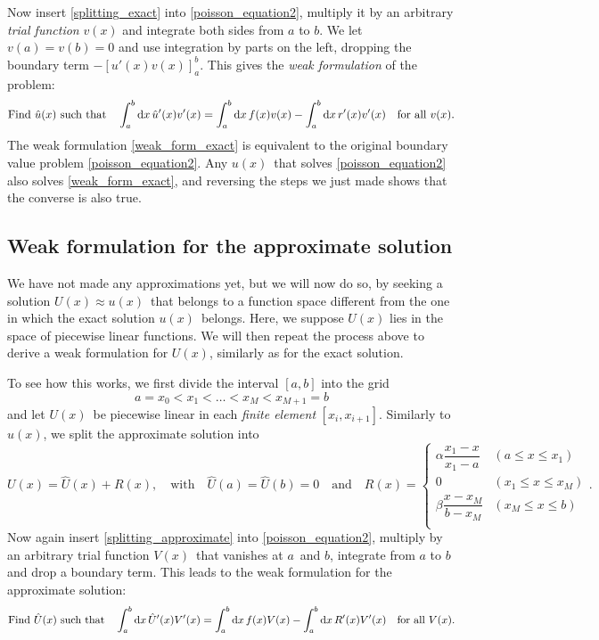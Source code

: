 Now insert \ref{splitting_exact} into \cref{poisson_equation2}, multiply it by an arbitrary \emph{trial function} $v(x)$ and integrate both sides from $a$ to $b$.
We let $v(a) = v(b) = 0$ and use integration by parts on the left, dropping the boundary term $-[u'(x) v(x)]_a^b$.
This gives the \emph{weak formulation} of the problem:
\newcommand{\weakform}[3]{
\text{Find} \,\, \hat{#1}(x) \,\, \text{such that}
\quad
\integral{\hat{#1}'(x) #2'(x)}{x}{a}{b} = \integral{f(x) #2(x)}{x}{a}{b} - \integral{#3'(x) #2'(x)}{x}{a}{b}
\quad
\text{for all} \,\, #2(x)
}
\begin{equation}
	\weakform{u}{v}{r}.
	\label{weak_form_exact}
\end{equation}
The weak formulation \ref{weak_form_exact} is equivalent to the original boundary value problem \ref{poisson_equation2}.
Any $u(x)$ that solves \ref{poisson_equation2} also solves \ref{weak_form_exact}, and reversing the steps we just made shows that the converse is also true.

\subsection{Weak formulation for the approximate solution}

We have not made any approximations yet, but we will now do so, by seeking a solution $U(x) \approx u(x)$ that belongs to a function space different from the one in which the exact solution $u(x)$ belongs.
Here, we suppose $U(x)$ lies in the space of piecewise linear functions.
We will then repeat the process above to derive a weak formulation for $U(x)$, similarly as for the exact solution.

To see how this works, we first divide the interval $[a, b]$ into the grid
\begin{equation}
	a = x_0 < x_1 < \dots < x_M < x_{M+1} = b
	\label{fem_grid}
\end{equation}
and let $U(x)$ be piecewise linear in each \emph{finite element} $[x_i, x_{i+1}]$.
Similarly to $u(x)$, we split the approximate solution into
\begin{equation}
	U(x) = \hat{U}(x) + R(x), \quad \text{with} \quad \hat{U}(a) = \hat{U}(b) = 0 \quad \text{and} \quad R(x) = 
	\begin{cases}
		\alpha \dfrac{x_1-x}{x_1-a} & (a \leq x \leq x_1)   \\
		0                           & (x_1 \leq x \leq x_M) \\
		\beta  \dfrac{x-x_M}{b-x_M} & (x_M \leq x \leq b)   \\
	\end{cases}
	.
	\label{splitting_approximate}
\end{equation}
Now again insert \ref{splitting_approximate} into \ref{poisson_equation2}, multiply by an arbitrary trial function $V(x)$ that vanishes at $a$ and $b$, integrate from $a$ to $b$ and drop a boundary term.
This leads to the weak formulation for the approximate solution:
\begin{equation}
	\weakform{U}{V}{R}.
	\label{weak_form_approximate}
\end{equation}

